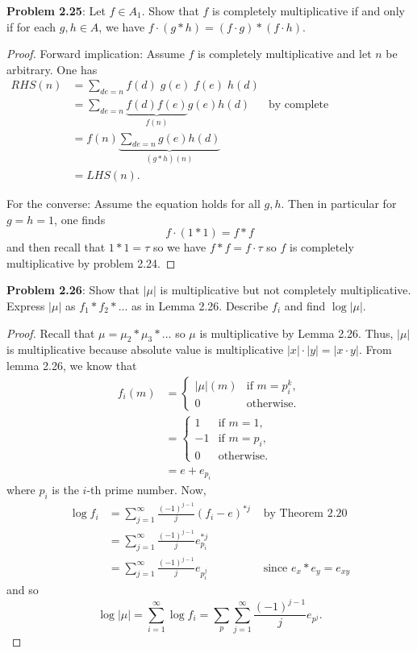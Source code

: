 \documentclass{article}
\begin{document}
\textbf{Problem 2.25}: Let $f \in A_1$. Show that $f$ is completely multiplicative if and only if for each $g, h \in A$, we have $f \cdot (g * h) = (f \cdot g) * (f \cdot h)$.

\begin{proof}
Forward implication: Assume $f$ is completely multiplicative and let $n$ be arbitrary. One has
\begin{align*}
RHS(n) &= \sum_{de = n} f(d) \; g(e) \; f(e) \; h(d)\\
&= \sum_{de = n} \underbrace{f(d) f(e)}_{f(n)} g(e) h(d) &\text{by complete multiplicativity}\\
&= f(n) \underbrace{\sum_{de = n} g(e) h(d)}_{(g * h)(n)}\\
&= LHS(n).
\end{align*}

For the converse: Assume the equation holds for all $g, h$. Then in particular for $g = h = 1$, one finds
$$f \cdot (1 * 1) = f * f$$
and then recall that $1 * 1 = \tau$ so we have $f * f = f \cdot \tau$ so $f$ is completely multiplicative by problem 2.24.
\end{proof}

\textbf{Problem 2.26}: Show that $|\mu|$ is multiplicative but not completely multiplicative. Express $|\mu|$ as $f_1 * f_2 * ...$ as in Lemma 2.26. Describe $f_i$ and find $\log |\mu|$.

\begin{proof}
Recall that $\mu = \mu_2 * \mu_3 * ...$ so $\mu$ is multiplicative by Lemma 2.26. Thus, $|\mu|$ is multiplicative because absolute value is multiplicative $|x| \cdot |y| = |x \cdot y|$. From lemma 2.26, we know that
\begin{align*}
f_i(m) &= \begin{cases}
|\mu|(m) &\text{if } m = p_i^k,\\
0 &\text{otherwise}.
\end{cases}\\
&= \begin{cases}
1 &\text{if } m = 1,\\
-1 &\text{if } m = p_i,\\
0 &\text{otherwise}.
\end{cases}\\
&= e + e_{p_i}
\end{align*}
where $p_i$ is the $i$-th prime number. Now,
\begin{align*}
\log f_i &= \sum_{j=1}^{\infty} \frac{(-1)^{j-1}}{j} (f_i - e)^{*j} &\text{ by Theorem 2.20}\\
&= \sum_{j=1}^{\infty} \frac{(-1)^{j-1}}{j} e_{p_i}^{*j}\\
&= \sum_{j=1}^{\infty} \frac{(-1)^{j-1}}{j} e_{p_i^j} &\text{ since } e_x * e_y = e_{xy}
\end{align*}
and so
$$\log |\mu| = \sum_{i=1}^{\infty} \log f_i = \sum_p \sum_{j=1}^{\infty} \frac{(-1)^{j-1}}{j} e_{p^j}.$$
\end{proof}
\end{document}
